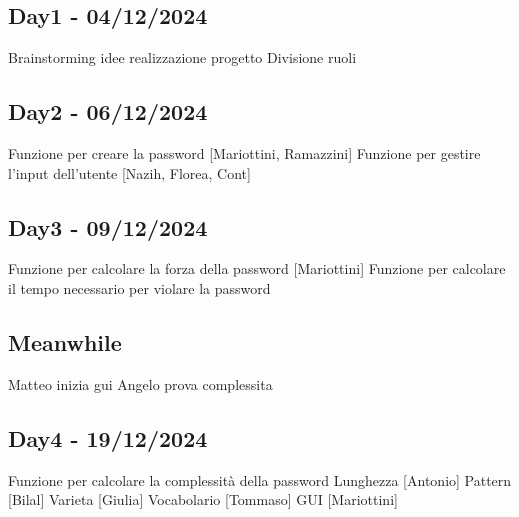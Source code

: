 \documentclass{scrartcl}
\begin{document}
        \subsection{Day1 - 04/12/2024}
            \begin{outline}
                \1 Brainstorming idee realizzazione progetto
                \1 Divisione ruoli
            \end{outline}
        
        \subsection{Day2 - 06/12/2024}
            \begin{outline}
                \1 Funzione per creare la password [Mariottini, Ramazzini]
                \1 Funzione per gestire l'input dell'utente [Nazih, Florea, Cont]
            \end{outline}
            
        \subsection{Day3 - 09/12/2024}
            \begin{outline}
                \1 Funzione per calcolare la forza della password [Mariottini]
                \1 Funzione per calcolare il tempo necessario per violare la password
            \end{outline}

        \subsection*{Meanwhile}
            \begin{outline}
                \1 Matteo inizia gui
                \1 Angelo prova complessita

            \end{outline}    
        
        \subsection{Day4 - 19/12/2024}
        \begin{outline}
            \1 Funzione per calcolare la complessità della password
                \2 Lunghezza [Antonio]
                \2 Pattern [Bilal]
                \2 Varieta [Giulia]
                \2 Vocabolario [Tommaso]
            \1 GUI [Mariottini]
        \end{outline}
\end{document}
